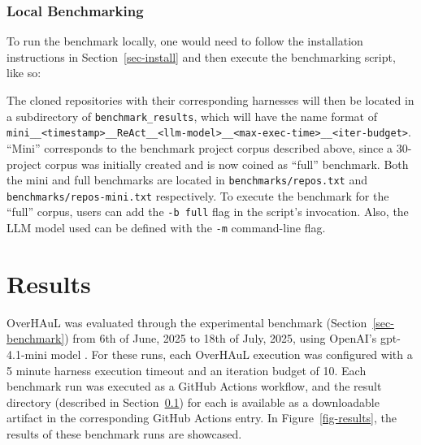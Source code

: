 \documentclass[
  a4paper,
]{scrreprt}
\newenvironment{Shaded}{\begin{snugshade}}{\end{snugshade}}
\newcommand{\NormalTok}[1]{\textcolor[rgb]{0.33,0.33,0.33}{#1}}
\theoremstyle{definition}
\theoremstyle{remark}
\begin{document}
\subsection{Local Benchmarking}\label{sec-local}

To run the benchmark locally, one would need to follow the installation
instructions in Section~\ref{sec-install} and then execute the
benchmarking script, like so:

\begin{Shaded}
\end{Shaded}

The cloned repositories with their corresponding harnesses will then be
located in a subdirectory of \texttt{benchmark\_results}, which will
have the name format of
\texttt{mini\_\_\textless{}timestamp\textgreater{}\_\_ReAct\_\_\textless{}llm-model\textgreater{}\_\_\textless{}max-exec-time\textgreater{}\_\_\textless{}iter-budget\textgreater{}}.
``Mini'' corresponds to the benchmark project corpus described above,
since a 30-project corpus was initially created and is now coined as
``full'' benchmark. Both the mini and full benchmarks are located in
\texttt{benchmarks/repos.txt} and \texttt{benchmarks/repos-mini.txt}
respectively. To execute the benchmark for the ``full'' corpus, users
can add the \texttt{-b\ full} flag in the script's invocation. Also, the
LLM model used can be defined with the \texttt{-m} command-line flag.


\chapter{Results}\label{sec-results}

OverHAuL was evaluated through the experimental benchmark
(Section~\ref{sec-benchmark}) from 6th of June, 2025 to 18th of July,
2025, using OpenAI's gpt-4.1-mini model \autocite{openaidocs2025}. For
these runs, each OverHAuL execution was configured with a 5 minute
harness execution timeout and an iteration budget of 10. Each benchmark
run was executed as a GitHub Actions workflow, and the result directory
(described in Section~\ref{sec-local}) for each is available as a
downloadable artifact in the corresponding GitHub Actions entry. In
Figure~\ref{fig-results}, the results of these benchmark runs are
showcased.
\end{document}
